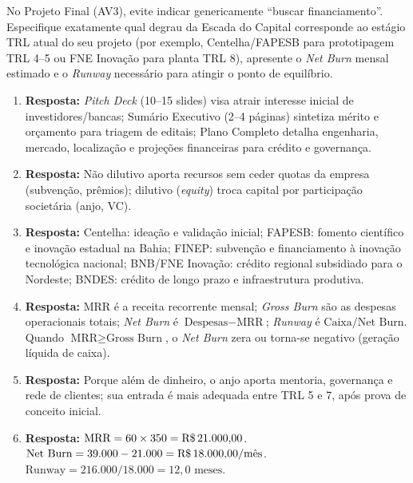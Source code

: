 \begin{boxDica}
  No Projeto Final (AV3), evite indicar genericamente ``buscar financiamento''. Especifique exatamente qual degrau da Escada do Capital corresponde ao estágio TRL atual do seu projeto (por exemplo, Centelha/FAPESB para prototipagem TRL 4–5 ou FNE Inovação para planta TRL 8), apresente o \textit{Net Burn} mensal estimado e o \textit{Runway} necessário para atingir o ponto de equilíbrio.
\end{boxDica}

\clearpage
{}

\begin{boxGabarito}
  \begin{enumerate}[leftmargin=1.5em, itemsep=4pt]
    \item \textbf{Resposta:} \textit{Pitch Deck} (10–15 slides) visa atrair interesse inicial de investidores/bancas; Sumário Executivo (2–4 páginas) sintetiza mérito e orçamento para triagem de editais; Plano Completo detalha engenharia, mercado, localização e projeções financeiras para crédito e governança.
    \item \textbf{Resposta:} Não dilutivo aporta recursos sem ceder quotas da empresa (subvenção, prêmios); dilutivo (\textit{equity}) troca capital por participação societária (anjo, VC).
    \item \textbf{Resposta:} Centelha: ideação e validação inicial; FAPESB: fomento científico e inovação estadual na Bahia; FINEP: subvenção e financiamento à inovação tecnológica nacional; BNB/FNE Inovação: crédito regional subsidiado para o Nordeste; BNDES: crédito de longo prazo e infraestrutura produtiva.
    \item \textbf{Resposta:} MRR é a receita recorrente mensal; \textit{Gross Burn} são as despesas operacionais totais; \textit{Net Burn} é $\text{Despesas} - \text{MRR}$; \textit{Runway} é $\text{Caixa} / \text{Net Burn}$. Quando $\text{MRR} \ge \text{Gross Burn}$, o \textit{Net Burn} zera ou torna-se negativo (geração líquida de caixa).
    \item \textbf{Resposta:} Porque além de dinheiro, o anjo aporta mentoria, governança e rede de clientes; sua entrada é mais adequada entre TRL 5 e 7, após prova de conceito inicial.
    \item \textbf{Resposta:} $\text{MRR} = 60 \times 350 = \text{R\$\,21.000,00}$. $\text{Net Burn} = 39.000 - 21.000 = \text{R\$\,18.000,00/mês}$. $\text{Runway} = 216.000 / 18.000 = 12{,}0\text{ meses}$.

\end{enumerate}
\end{boxGabarito}
